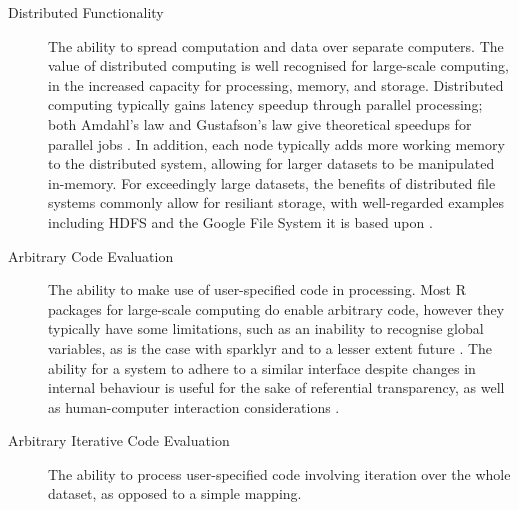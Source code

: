 \documentclass[a4paper,10pt]{article}
\begin{document}
\begin{description}
	\item[Distributed Functionality]
		The ability to spread computation and data over separate
		computers.
		The value of distributed computing is well recognised for
		large-scale computing, in the increased capacity for
		processing, memory, and storage.
		Distributed computing typically gains latency speedup
		through parallel processing; both Amdahl's law and Gustafson's
		law give theoretical speedups for parallel jobs
		\cite{amdahl1967law} \cite{gustafson1988law}.  
		In addition, each node typically adds more working memory to the
		distributed system, allowing for larger datasets to be
		manipulated in-memory.  
		For exceedingly large datasets, the benefits of distributed
		file systems commonly allow for resiliant storage, with well-regarded
		examples including HDFS and the Google File System it is based
		upon \cite{shvachko2010hadoop} \cite{ghemawat2003google}.
	\item[Arbitrary Code Evaluation] 
		The ability to make use of user-specified code in processing.
		Most R packages for large-scale computing do enable arbitrary code,
		however they typically have some limitations, such as an inability to
		recognise global variables, as is the case with sparklyr and to a lesser
		extent future \cite{sparklyr2020limitations} \cite{microsoft20}.
		The ability for a system to adhere to a similar interface despite 
		changes in internal behaviour is useful for the sake of referential
		transparency, as well as human-computer interaction considerations
		\cite{sondergaard1990Rtda} \cite{norman2013design}.
	\item[Arbitrary Iterative Code Evaluation] The ability to process
	      user-specified code involving iteration over the whole dataset, as opposed to a
	      simple mapping.


\end{description}
\end{document}
